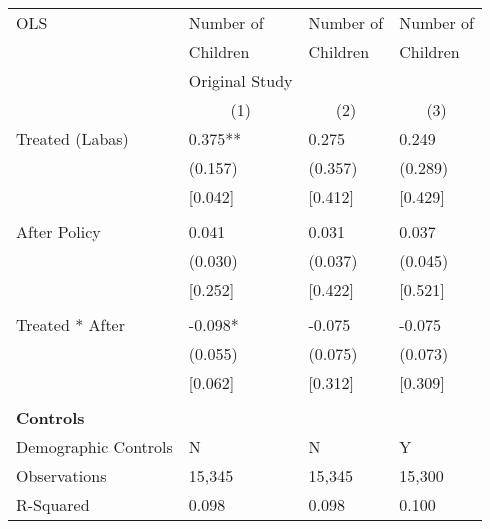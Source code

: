 \begin{tabular}{p{4cm}p{1.5cm}p{1.5cm}p{1.5cm}}
\hline\hline
OLS               &Number of & Number of &Number of \\
&Children & Children & Children\\
&Original Study & &  \\
&\multicolumn{1}{c}{(1)}&\multicolumn{1}{c}{(2)}&\multicolumn{1}{c}{(3)}\\
\hline
Treated (Labas)   &  0.375**&   0.275 & 0.249 \\
                &  (0.157)&  (0.357) & (0.289)\\
									& [0.042]	 &  [0.412]&  [0.429]\\										
                \\
After Policy   &   0.041&   0.031 &0.037\\
                &  (0.030)&  (0.037) & (0.045)\\
									& [0.252]	 &  [0.422]&  [0.521]\\										
                \\
Treated * After   & -0.098*&  -0.075 & -0.075\\
                &  (0.055)&  (0.075) &(0.073)\\
									& [0.062]	 &  [0.312]&  [0.309]\\										
                \\

\multicolumn{4}{l}{\textbf{Controls}}  \\                  
Demographic Controls       &   N     &        N&        Y\\

\hline
Observations    &    15,345&    15,345 & 15,300\\
R-Squared    &  0.098   & 0.098 & 0.100     \\
\hline\hline
\end{tabular}


